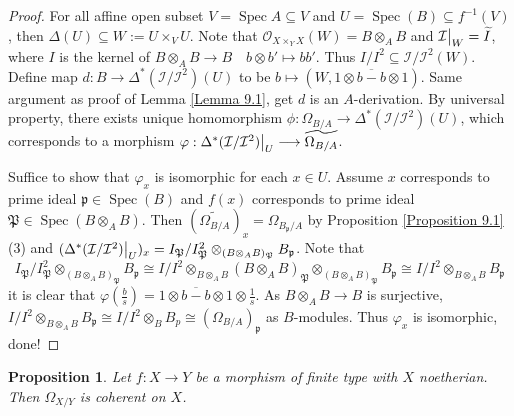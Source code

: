 \documentclass{ctexart}
\newtheorem{proposition}{Proposition}[section]
\newcommand{\spec}{\operatorname{Spec}}
\begin{document}
\begin{proof}
    For all affine open subset $V = \spec A \subseteq V$ and $U = \spec(B) \subseteq f^{-1}(V)$, then $\Delta(U) \subseteq W := U \times_{V} U$.
    Note that $\mathcal{O}_{X \times_{Y} X}(W) = B \otimes_{A} B$ and $\mathcal{I}\big{|}_{W} = \widetilde{I}$, where $I$ is the kernel of $B \otimes_{A} B \longrightarrow B\quad b \otimes b' \longmapsto bb'$.
    Thus $I/I^{2} \subseteq \mathcal{I}/\mathcal{I}^{2}(W)$.
    Define map $d: B \longrightarrow \Delta^{\ast}(\mathcal{I}/\mathcal{I}^{2})(U)$ to be $b \longmapsto (W, \overline{1 \otimes b - b \otimes 1})$.
    Same argument as proof of Lemma \ref{Lemma 9.1}, get $d$ is an $A$-derivation.
    By universal property, there exists unique homomorphism $\phi: \Omega_{B/A} \longrightarrow \Delta^{\ast}(\mathcal{I}/\mathcal{I}^{2})(U)$, which corresponds to a morphism $\varphi: \Delta^{\ast}(\mathcal{I}/\mathcal{I}^{2})\big{|}_{U} \longrightarrow \widetilde{\Omega_{B/A}}$.
    \par
    Suffice to show that $\varphi_{x}$ is isomorphic for each $x\in U$.
    Assume $x$ corresponds to prime ideal $\mathfrak{p}\in \spec(B)$ and $f(x)$ corresponds to prime ideal $\mathfrak{P}\in \spec(B \otimes_{A} B)$.
    Then $(\widetilde{\Omega_{B/A}})_{x} = \Omega_{B_{\mathfrak{p}}/A}$ by Proposition \ref{Proposition 9.1} (3) and $(\Delta^{\ast}(\mathcal{I}/\mathcal{I}^{2})\big{|}_{U})_{x} = I_{\mathfrak{P}}/I_{\mathfrak{P}}^{2} \otimes_{(B \otimes_{A} B)_{\mathfrak{P}}} B_{\mathfrak{p}}$.
    Note that 
    \begin{equation*}
        I_{\mathfrak{P}}/I_{\mathfrak{P}}^{2} \otimes_{(B \otimes_{A} B)_{\mathfrak{P}}} B_{\mathfrak{p}} \cong I/I^{2} \otimes_{B \otimes_{A} B} (B \otimes_{A} B)_{\mathfrak{P}} \otimes_{(B \otimes_{A} B)_{\mathfrak{P}}} B_{\mathfrak{p}} \cong I/I^{2} \otimes_{B \otimes_{A} B} B_{\mathfrak{p}}
    \end{equation*}
    it is clear that $\varphi(\frac{b}{s}) = \overline{1 \otimes b - b \otimes 1} \otimes \frac{1}{s}$.
    As $B \otimes_{A} B \longrightarrow B$ is surjective, $I/I^{2} \otimes_{B \otimes_{A} B} B_{\mathfrak{p}} \cong I/I^{2} \otimes_{B} B_{p} \cong (\Omega_{B/A})_{\mathfrak{p}}$ as $B$-modules.
    Thus $\varphi_{x}$ is isomorphic, done!
\end{proof}
\begin{proposition}
    Let $f: X \longrightarrow Y$ be a morphism of finite type with $X$ noetherian.
    Then $\Omega_{X/Y}$ is coherent on $X$.
    \label{Proposition 9.4}
\end{proposition}
\end{document}

